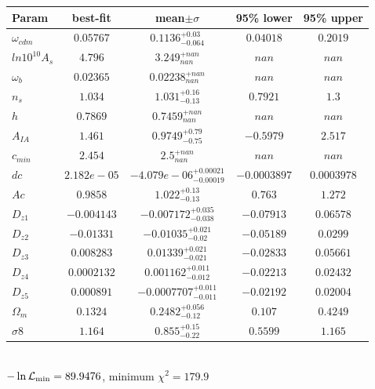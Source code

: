 \begin{tabular}{|l|c|c|c|c|} 
 \hline 
Param & best-fit & mean$\pm\sigma$ & 95\% lower & 95\% upper \\ \hline 
$\omega_{cdm }$ &$0.05767$ & $0.1136_{-0.064}^{+0.03}$ & $0.04018$ & $0.2019$ \\ 
$ln10^{10}A_{s }$ &$4.796$ & $3.249_{nan}^{+nan}$ & $nan$ & $nan$ \\ 
$\omega_{b }$ &$0.02365$ & $0.02238_{nan}^{+nan}$ & $nan$ & $nan$ \\ 
$n_{s }$ &$1.034$ & $1.031_{-0.13}^{+0.16}$ & $0.7921$ & $1.3$ \\ 
$h$ &$0.7869$ & $0.7459_{nan}^{+nan}$ & $nan$ & $nan$ \\ 
$A_{IA }$ &$1.461$ & $0.9749_{-0.75}^{+0.79}$ & $-0.5979$ & $2.517$ \\ 
$c_{min }$ &$2.454$ & $2.5_{nan}^{+nan}$ & $nan$ & $nan$ \\ 
$dc$ &$2.182e-05$ & $-4.079e-06_{-0.00019}^{+0.00021}$ & $-0.0003897$ & $0.0003978$ \\ 
$Ac$ &$0.9858$ & $1.022_{-0.13}^{+0.13}$ & $0.763$ & $1.272$ \\ 
$D_{z1 }$ &$-0.004143$ & $-0.007172_{-0.038}^{+0.035}$ & $-0.07913$ & $0.06578$ \\ 
$D_{z2 }$ &$-0.01331$ & $-0.01035_{-0.02}^{+0.021}$ & $-0.05189$ & $0.0299$ \\ 
$D_{z3 }$ &$0.008283$ & $0.01339_{-0.021}^{+0.021}$ & $-0.02833$ & $0.05661$ \\ 
$D_{z4 }$ &$0.0002132$ & $0.001162_{-0.012}^{+0.011}$ & $-0.02213$ & $0.02432$ \\ 
$D_{z5 }$ &$0.000891$ & $-0.0007707_{-0.011}^{+0.011}$ & $-0.02192$ & $0.02004$ \\ 
$\Omega_{m }$ &$0.1324$ & $0.2482_{-0.12}^{+0.056}$ & $0.107$ & $0.4249$ \\ 
$\sigma8$ &$1.164$ & $0.855_{-0.22}^{+0.15}$ & $0.5599$ & $1.165$ \\ 
\hline 
 \end{tabular} \\ 
$-\ln{\cal L}_\mathrm{min} =89.9476$, minimum $\chi^2=179.9$ \\ 
